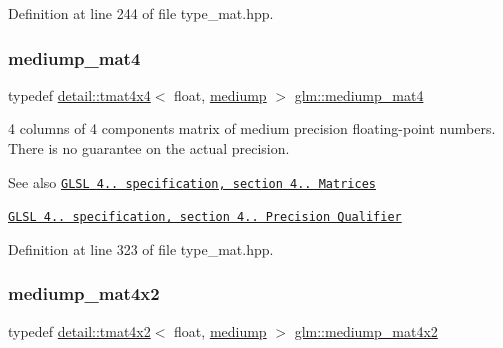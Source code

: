 Definition at line 244 of file type\+\_\+mat.\+hpp.

\mbox{\label{group__core__precision_gaf3de9a0400cf707d3c159f32902b92db}} 
\subsubsection{\texorpdfstring{mediump\+\_\+mat4}{mediump\_mat4}}
{\footnotesize\ttfamily typedef \hyperlink{structglm_1_1detail_1_1tmat4x4}{detail\+::tmat4x4}$<$ float, \hyperlink{namespaceglm_a0f04f086094c747d227af4425893f545a6416f3ea0c9025fb21ed50c4d6620482}{mediump} $>$ \hyperlink{group__core__precision_gaf3de9a0400cf707d3c159f32902b92db}{glm\+::mediump\+\_\+mat4}}

4 columns of 4 components matrix of medium precision floating-\/point numbers. There is no guarantee on the actual precision.

\begin{DoxySeeAlso}{See also}
\href{http://www.opengl.org/registry/doc/GLSLangSpec.4.20.8.pdf}{\tt G\+L\+SL 4.. specification, section 4.. Matrices} 

\href{http://www.opengl.org/registry/doc/GLSLangSpec.4.20.8.pdf}{\tt G\+L\+SL 4.. specification, section 4.. Precision Qualifier} 
\end{DoxySeeAlso}


Definition at line 323 of file type\+\_\+mat.\+hpp.

\mbox{\label{group__core__precision_ga5ade2a6a65653683f76988c45da39f15}} 
\subsubsection{\texorpdfstring{mediump\+\_\+mat4x2}{mediump\_mat4x2}}
{\footnotesize\ttfamily typedef \hyperlink{structglm_1_1detail_1_1tmat4x2}{detail\+::tmat4x2}$<$ float, \hyperlink{namespaceglm_a0f04f086094c747d227af4425893f545a6416f3ea0c9025fb21ed50c4d6620482}{mediump} $>$ \hyperlink{group__core__precision_ga5ade2a6a65653683f76988c45da39f15}{glm\+::mediump\+\_\+mat4x2}}

